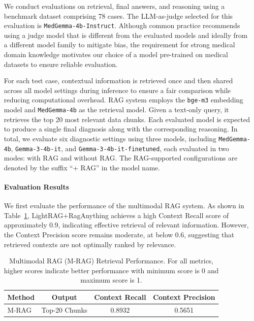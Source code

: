 We conduct evaluations on retrieval, final answers, and reasoning using a benchmark dataset comprising 78 cases. The LLM-as-judge selected for this evaluation is \texttt{MedGemma-4b-Instruct}. Although common practice recommends using a judge model that is different from the evaluated models and ideally from a different model family to mitigate bias, the requirement for strong medical domain knowledge motivates our choice of a model pre-trained on medical datasets to ensure reliable evaluation.

For each test case, contextual information is retrieved once and then shared across all model settings during inference to ensure a fair comparison while reducing computational overhead. RAG system employs the \texttt{bge-m3} embedding model and \texttt{MedGemma-4b} as the retrieval model. Given a text-only query, it retrieves the top 20 most relevant data chunks. Each evaluated model is expected to produce a single final diagnosis along with the corresponding reasoning. In total, we evaluate six diagnostic settings using three models, including \texttt{MedGemma-4b}, \texttt{Gemma-3-4b-it}, and \texttt{Gemma-3-4b-it-finetuned}, each evaluated in two modes: with \ac{RAG} and without \ac{RAG}. The RAG-supported configurations are denoted by the suffix “+ RAG” in the model name.

\paragraph{Evaluation Results}

We first evaluate the performance of the multimodal RAG system. As shown in Table~\ref{tab:lightrag_results}, LightRAG+RagAnything achieves a high Context Recall score of approximately 0.9, indicating effective retrieval of relevant information. However, the Context Precision score remains moderate, at below 0.6, suggesting that retrieved contexts are not optimally ranked by relevance.

\begin{table}[htbp]
\centering
\caption{Multimodal RAG (M-RAG) Retrieval Performance. For all metrics, higher scores indicate better performance with minimum score is 0 and maximum score is 1.}
\label{tab:lightrag_results}
\setlength{\tabcolsep}{2pt} %
\begin{tabular}{lccc}
\hline
\textbf{Method} &
\textbf{Output} &
\textbf{Context Recall} &
\textbf{Context Precision} \\
\hline
M-RAG &
Top-20 Chunks &
0.8932 &
0.5651 \\
\hline
\end{tabular}
\end{table}

